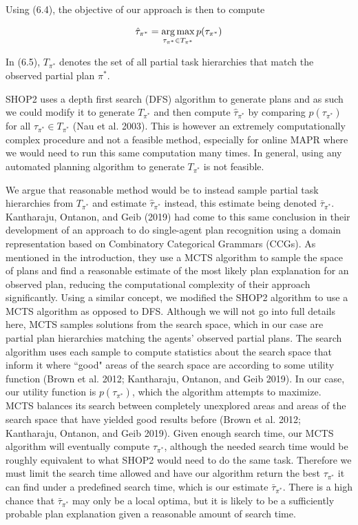 Using (6.4), the objective of our approach is then to compute 

\begin{equation}
\hat{\tau}_{\pi^*} = \operatorname*{arg\,max}_{\tau_{\pi^*} \in T_{\pi^*}} p(\tau_{\pi^*})
\end{equation}

In (6.5), $T_{\pi^*}$ denotes the set of all partial task hierarchies that match the observed partial plan $\pi^*$.

SHOP2 uses a depth first search (DFS) algorithm to generate plans and as such we could modify it to generate $T_{\pi^*}$ and then compute $\hat{\tau}_{\pi^*}$ by comparing $p(\tau_{\pi^*})$ for all $\tau_{\pi^*} \in T_{\pi^*}$ (Nau et al. 2003). This is however an extremely computationally complex procedure and not a feasible method, especially for online MAPR where we would need to run this same computation many times. In general, using any automated planning algorithm to generate $T_{\pi^*}$ is not feasible. 

We argue that reasonable method would be to instead sample partial task hierarchies from $T_{\pi^*}$ and estimate $\hat{\tau}_{\pi^*}$ instead, this estimate being denoted $\bar{\tau}_{\pi^*}$. Kantharaju, Ontanon, and Geib (2019) had come to this same conclusion in their development of an approach to do single-agent plan recognition using a domain representation based on Combinatory Categorical Grammars (CCGs). As mentioned in the introduction, they use a MCTS algorithm to sample the space of plans and find a reasonable estimate of the most likely plan explanation for an observed plan, reducing the computational complexity of their approach significantly. Using a similar concept, we modified the SHOP2 algorithm to use a MCTS algorithm as opposed to DFS. Although we will not go into full details here, MCTS samples solutions from the search space, which in our case are partial plan hierarchies matching the agents' observed partial plans. The search algorithm uses each sample to compute statistics about the search space that inform it where ``good" areas of the search space are according to some utility function (Brown et al. 2012; Kantharaju, Ontanon, and Geib 2019). In our case, our utility function is $p(\tau_{\pi^*})$, which the algorithm attempts to maximize. MCTS balances its search between completely unexplored areas and areas of the search space that have yielded good results before (Brown et al. 2012; Kantharaju, Ontanon, and Geib 2019). Given enough search time, our MCTS algorithm will eventually compute $\hat{\tau}_{\pi^*}$, although the needed search time would be roughly equivalent to what SHOP2 would need to do the same task. Therefore we must limit the search time allowed and have our algorithm return the best $\tau_{\pi^*}$ it can find under a predefined search time, which is our estimate $\bar{\tau}_{\pi^*}$. There is a high chance that $\bar{\tau}_{\pi^*}$ may only be a local optima, but it is likely to be a sufficiently probable plan explanation given a reasonable amount of search time. 

